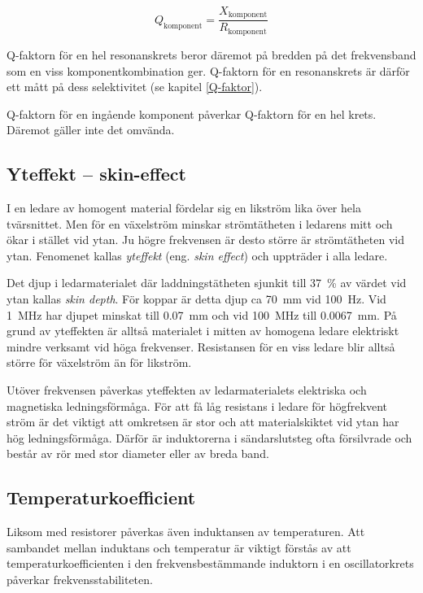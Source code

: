 \[Q_\text{komponent} = \dfrac{X_\text{komponent}}{R_\text{komponent}}\]

Q-faktorn för en hel resonanskrets beror däremot på bredden på det
frekvensband som en viss komponentkombination ger.
Q-faktorn för en resonanskrets är därför ett mått på dess
selektivitet (se kapitel \ref{Q-faktor}).

Q-faktorn för en ingående komponent påverkar Q-faktorn för en hel krets.
Däremot gäller inte det omvända.

\subsection{Yteffekt -- skin-effect}

I en ledare av homogent material fördelar sig en likström lika över hela
tvärsnittet. Men för en växelström minskar strömtätheten i ledarens mitt
och ökar i stället vid ytan.
Ju högre frekvensen är desto större är strömtätheten vid ytan.
Fenomenet kallas \emph{yteffekt} (eng. \emph{skin effect}) och uppträder i alla
ledare.

Det djup i ledarmaterialet där laddningstätheten sjunkit till \SI{37}{\percent}
av värdet vid ytan kallas \emph{skin depth}.
För koppar är detta djup ca \SI{70}{\milli\metre} vid \SI{100}{\hertz}.
Vid \SI{1}{\mega\hertz} har djupet minskat till \SI{0,07}{\milli\metre} och vid
\SI{100}{\mega\hertz} till \SI{0,0067}{\milli\metre}.
På grund av yteffekten är alltså materialet i mitten av homogena
ledare elektriskt mindre verksamt vid höga frekvenser. Resistansen för en viss ledare 
blir alltså större för växelström än för likström.

Utöver frekvensen påverkas yteffekten av ledarmaterialets elektriska och
magnetiska ledningsförmåga. För att få låg resistans i ledare för högfrekvent
ström är det viktigt att omkretsen är stor och att materialskiktet vid ytan har
hög ledningsförmåga. Därför är induktorerna i sändarslutsteg ofta 
försilvrade och består av rör med stor diameter eller av breda band.

\subsection{Temperaturkoefficient}

Liksom med resistorer påverkas även induktansen av temperaturen. Att sambandet
mellan induktans och temperatur är viktigt förstås av att
temperaturkoefficienten i den frekvensbestämmande induktorn i en oscillatorkrets
påverkar frekvensstabiliteten.

